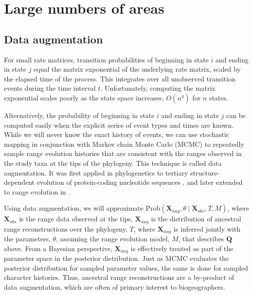 \section{Large numbers of areas}
\label{sec:bayarea}

\setlength{\parindent}{0pt}

\subsection{Data augmentation}
\label{sec:data_aug}

For small rate matrices, transition probabilities of beginning in state $i$ and ending in state $j$ equal the matrix exponential of the underlying rate matrix, scaled by the elapsed time of the process.
This integrates over all unobserved transition events during the time interval $t$.
Unfortunately, computing the matrix exponential scales poorly as the state space increases, \IE $O(n^4)$ for $n$ states.

Alternatively, the probability of beginning in state $i$ and ending in state $j$ can be computed easily when the explicit series of event types and times are known.
While we will never know the exact history of events, we can use stochastic mapping in conjunction with Markov chain Monte Carlo (MCMC) to repeatedly sample range evolution histories that are consistent with the ranges observed in the study taxa at the tips of the phylogeny.
This technique is called data augmentation. It was first applied in phylogenetics to tertiary structure-dependent evolution of protein-coding nucleotide sequences \citep{robinson03}, and later extended to range evolution in \citet{landis13}.

Using data augmentation, we will approximate {Prob$\left( \textbf{X}_{aug}, \theta \mid \textbf{X}_{obs}, T, M \right)$}, where $\textbf{X}_{obs}$ is the range data observed at the tips, $\textbf{X}_{aug}$ is the distribution of ancestral range reconstructions over the phylogeny, $T$, where $\textbf{X}_{aug}$ is inferred jointly with the parameters, $\theta$, assuming the range evolution model, $M$, that describes $\textbf{Q}$ above.
From a Bayesian perspective, $\textbf{X}_{aug}$ is effectively treated as part of the parameter space in the posterior distribution.
Just as MCMC evaluates the posterior distribution for sampled parameter values, the same is done for sampled character histories.
Thus, ancestral range reconstructions are a by-product of data augmentation, which are often of primary interest to biogeographers.

